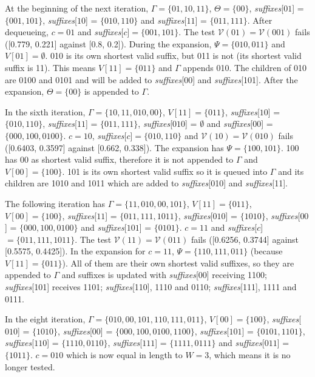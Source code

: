 {At the beginning of the next iteration, $\Gamma = \{01, 10, 11\}$, $\Theta = \{00\}$, \textit{suffixes}[$01$] = $\{001, 101\}$, \textit{suffixes}[$10$] = $\{010, 110\}$ and \textit{suffixes}[$11$] = $\{011, 111\}$. After dequeueing, $c = 01$ and \textit{suffixes}[$c$]$ = \{001, 101\}$. The test $\mathcal{V}(01) = \mathcal{V}(001)$ fails ([0.779, 0.221] against [0.8, 0.2]). During the expansion, $\Psi = \{010, 011\}$ and $V[01] = \emptyset$. 010 is its own shortest valid suffix, but 011 is not (its shortest valid suffix is 11). This means $V[11] = \{011\}$ and $\Gamma$ appends 010. The children of 010 are 0100 and 0101 and will be added to \textit{suffixes}[00] and \textit{suffixes}[101]. After the expansion, $\Theta = \{00\}$ is appended to $\Gamma$.

In the sixth iteration, $\Gamma = \{10, 11, 010, 00\}$, $V[11] = \{011\}$, \textit{suffixes}[$10$] = $\{010, 110\}$, \textit{suffixes}[$11$] = $\{011, 111\}$,  \textit{suffixes}[$010$] = $\emptyset$ and  \textit{suffixes}[$00$] = $\{000, 100, 0100\}$. $c = 10$, \textit{suffixes}[$c$]$ = \{010, 110\}$ and $\mathcal{V}(10) = \mathcal{V}(010)$ fails ([0.6403, 0.3597] against [0.662, 0.338]). The expansion has $\Psi = \{100, 101\}$. 100 has 00 as shortest valid suffix, therefore it is not appended to $\Gamma$ and $V[00] = \{100\}$. 101 is its own shortest valid suffix so it is queued into $\Gamma$ and its children are 1010 and 1011 which are added to \textit{suffixes}[010] and \textit{suffixes}[11].

The following iteration has $\Gamma = \{11, 010, 00, 101\}$, $V[11] = \{011\}$, $V[00] = \{100\}$, \textit{suffixes}[$11$] = $\{011, 111, 1011\}$,  \textit{suffixes}[$010$] = $\{1010\}$, \textit{suffixes}[$00$] = $\{000, 100, 0100\}$ and \textit{suffixes}[$101$] = $\{0101\}$. $c = 11$ and \textit{suffixes}[$c$]$ = \{011, 111, 1011\}$. The test $\mathcal{V}(11) = \mathcal{V}(011)$ fails ([0.6256, 0.3744] against [0.5575, 0.4425]). In the expansion for $c = 11$, $\Psi = \{110, 111, 011\}$ (because $V[11] = \{011\}$).  All of them are their own shortest valid suffixes, so they are appended to $\Gamma$ and suffixes is updated with \textit{suffixes}[00] receiving 1100; \textit{suffixes}[101] receives 1101; \textit{suffixes}[110], 1110 and 0110; \textit{suffixes}[111], 1111 and 0111.

In the eight iteration, $\Gamma = \{010, 00, 101, 110, 111, 011\}$, $V[00] = \{100\}$, \textit{suffixes}[$010$] = $\{1010\}$, \textit{suffixes}[$00$] = $\{000, 100, 0100, 1100\}$, \textit{suffixes}[$101$] = $\{0101, 1101\}$, \textit{suffixes}[$110$] = $\{1110, 0110\}$, \textit{suffixes}[$111$] = $\{1111, 0111\}$ and \textit{suffixes}[$011$] = $\{1011\}$. $c = 010$ which is now equal in length to $W = 3$, which means it is no longer tested.

}
